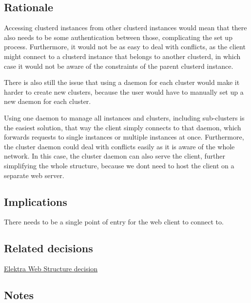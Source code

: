 \subsection*{Rationale}

Accessing clusterd instances from other clusterd instances would mean that there also needs to be some authentication between those, complicating the set up process. Furthermore, it would not be as easy to deal with conflicts, as the client might connect to a clusterd instance that belongs to another clusterd, in which case it would not be aware of the constraints of the parent clusterd instance.

There is also still the issue that using a daemon for each cluster would make it harder to create new clusters, because the user would have to manually set up a new daemon for each cluster.

Using one daemon to manage all instances and clusters, including sub-\/clusters is the easiest solution, that way the client simply connects to that daemon, which forwards requests to single instances or multiple instances at once. Furthermore, the cluster daemon could deal with conflicts easily as it is aware of the whole network. In this case, the cluster daemon can also serve the client, further simplifying the whole structure, because we don\textquotesingle{}t need to host the client on a separate web server.

\subsection*{Implications}


\begin{DoxyItemize}
\item There needs to be a single point of entry for the web client to connect to.
\end{DoxyItemize}

\subsection*{Related decisions}


\begin{DoxyItemize}
\item \hyperlink{doc_decisions_elektra_web_md}{Elektra Web Structure decision}
\end{DoxyItemize}

\subsection*{Notes}